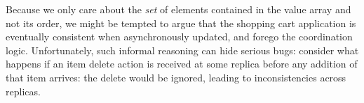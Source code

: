 
Because we only care about the \emph{set} of elements contained in the value array
and not its order, we might be tempted to argue that 
the shopping cart application is eventually consistent
when asynchronously updated, and forego the coordination logic.  Unfortunately, such informal reasoning can hide serious bugs: consider what happens if an item delete action is received at some replica
before any addition of that item arrives: the delete would be ignored, leading to inconsistencies across replicas.

